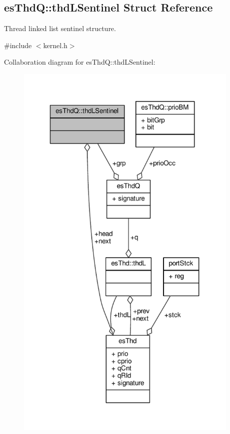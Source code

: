 \hypertarget{structesThdQ_1_1thdLSentinel}{\subsection{es\-Thd\-Q\-:\-:thd\-L\-Sentinel Struct Reference}
\label{structesThdQ_1_1thdLSentinel}
}


Thread linked list sentinel structure.  




{\ttfamily \#include $<$kernel.\-h$>$}



Collaboration diagram for es\-Thd\-Q\-:\-:thd\-L\-Sentinel\-:\nopagebreak
\begin{figure}[H]
\begin{center}
\leavevmode
\includegraphics[width=303pt]{structesThdQ_1_1thdLSentinel__coll__graph}
\end{center}
\end{figure}
